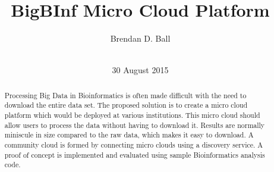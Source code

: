\documentclass{sig-alternate-05-2015}
\begin{document}


\title{BigBInf Micro Cloud Platform}

\author{
\alignauthor
Brendan D. Ball\\
       \\
}

\date{30 August 2015}


\maketitle
\begin{abstract}
Processing Big Data in Bioinformatics is often made difficult with the need to download the entire data set. The proposed solution is to create a micro cloud platform which would be deployed at various institutions. This micro cloud should allow users to process the data without having to download it. Results are normally miniscule in size compared to the raw data, which makes it easy to download. A community cloud is formed by connecting micro clouds using a discovery service. A proof of concept is implemented and evaluated using sample Bioinformatics analysis code.
\end{abstract}
\end{document}
